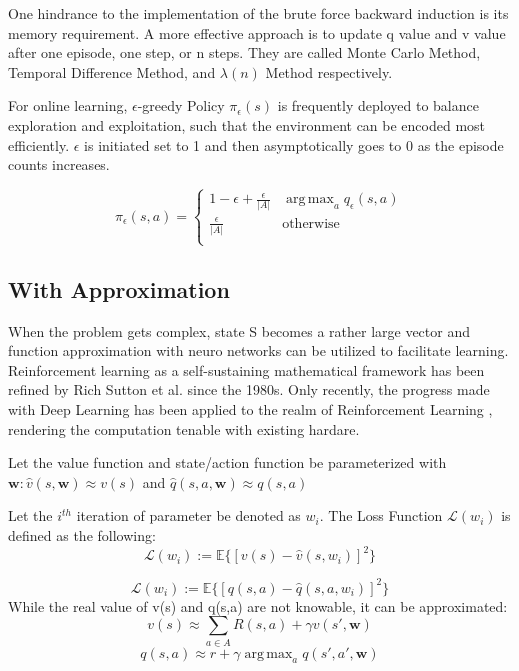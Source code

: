 \documentclass[journal]{IEEEtran}
\DeclareMathOperator*{\argmax}{arg\,max}  %
\begin{document}
One hindrance to the implementation of the brute force backward induction is its memory requirement. A more effective approach is to update q value and v value after one episode, one step, or n steps. They are called Monte Carlo Method, Temporal Difference Method, and $\lambda(n)$ Method respectively.

For online learning, $\epsilon$-greedy Policy $\pi_{\epsilon}(s)$ is frequently deployed to balance exploration and exploitation, such that the environment can be encoded most efficiently. $\epsilon$ is initiated set to 1 and then asymptotically goes to 0 as the episode counts increases.

\begin{equation*}
    \pi_{\epsilon}(s,a) = \begin{cases}
        1-\epsilon+\frac{\epsilon}{|A|}& \displaystyle\argmax_{a} q_{\epsilon}(s,a)\\
        \frac{\epsilon}{|A|}& \text{otherwise}\\
           \end{cases}
\end{equation*}

\subsection{With Approximation}
When the problem gets complex, state S becomes a rather large vector and function approximation with neuro networks can be utilized to facilitate learning. Reinforcement learning as a self-sustaining mathematical framework has been refined by Rich Sutton et al. since the 1980s. Only recently, the progress made with Deep Learning has been applied to the realm of Reinforcement Learning \cite{Mnih2013PlayingAW}, rendering the computation tenable with existing hardare.

Let the value function and state/action function be parameterized with $\textbf{w}:  \hat{v}(s,\textbf{w}) \approx v(s)$ and $\hat{q}(s,a,\textbf{w}) \approx q(s,a) $

Let the $i^{th}$ iteration of parameter be denoted as $\textbf{$w_i$}$. The Loss Function $\mathcal{L}(\textbf{$w_i$})$ is defined as the following:
\begin{equation}
    \mathcal{L}(\textbf{$w_i$}) := \mathbb{E}\{[v(s)-\hat{v}(s,\textbf{$w_i$})]^2\}
    \label{v_loss}
\end{equation}

\begin{equation}
    \mathcal{L}(\textbf{$w_i$}) := \mathbb{E}\{[q(s,a)-\hat{q}(s,a,\textbf{$w_i$})]^2\}
    \label{q_loss}
\end{equation}
While the real value of v(s) and q(s,a) are not knowable, it can be approximated:
\begin{equation}
    v(s) \approx \sum_{a \in A} R(s,a)+\gamma v(s',\textbf{w})
    \label{v_approx}
\end{equation}
\begin{equation}
    q(s,a) \approx r+\gamma \argmax_{a} q(s',a',\textbf{w})
    \label{q_approx}
\end{equation}
\end{document}
